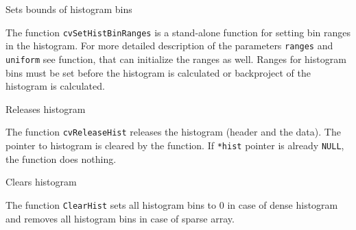 \label{SetHistBinRanges}

Sets bounds of histogram bins


\begin{description}
\end{description}

The function \texttt{cvSetHistBinRanges} is a stand-alone function for setting bin ranges in the histogram. For more detailed description of the parameters \texttt{ranges} and \texttt{uniform} see  function, that can initialize the ranges as well. Ranges for histogram bins must be set before the histogram is calculated or backproject of the histogram is calculated.


\label{ReleaseHist}

Releases histogram


\begin{description}
\end{description}

The function \texttt{cvReleaseHist} releases the histogram (header and the data). The pointer to histogram is cleared by the function. If \texttt{*hist} pointer is already \texttt{NULL}, the function does nothing.

\label{ClearHist}

Clears histogram


\begin{description}
\end{description}

The function \texttt{ClearHist} sets all histogram bins to 0 in case of dense histogram and removes all histogram bins in case of sparse array.

\label{MakeHistHeaderForArray}

